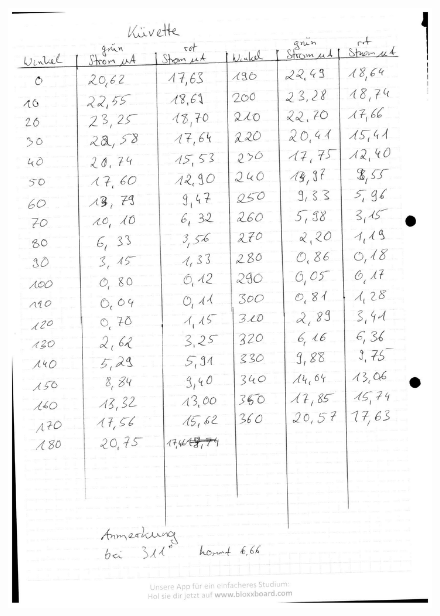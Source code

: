 \documentclass[fontsize=12pt]{scrartcl}
\begin{document}
\begin{figure}[H]
\vspace{-17pt}
        \includegraphics[scale=0.6]{Graphik/4}
        \vspace{-10pt}

\end{figure}
\end{document}
